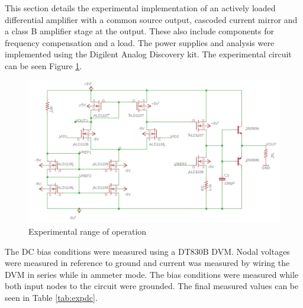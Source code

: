 
	
	
	
		
		
		
	This section details the experimental implementation of an actively loaded differential amplifier with a common source output, cascoded current mirror and a class B amplifier stage at the output. These also include components for frequency compensation and a load. The power supplies and analysis were implemented using the Digilent Analog Discovery kit. The experimental circuit can be seen Figure \ref{fig:expercircuit}.
		
		
				
		\begin{figure}[H]
			\begin{center}
				\includegraphics[scale=.40]{ExperimentalImplementation/expschem.png}
				\caption{Experimental range of operation}
				\label{fig:expercircuit}
			\end{center}
		\end{figure}

	
	The DC bias conditions were measured using a DT830B DVM. Nodal voltages were measured in reference to ground and current was measured by wiring the DVM in series while in ammeter mode. The bias conditions were measured while both input nodes to the circuit were grounded. The final measured values can be seen in Table \ref{tab:expdc}.
		
